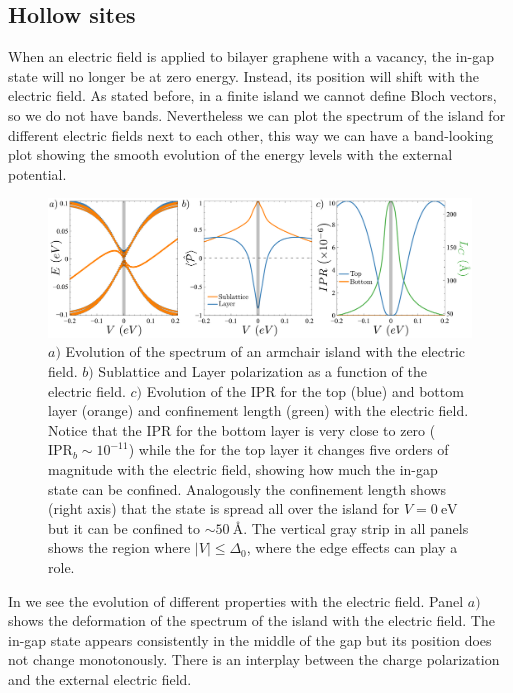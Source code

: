 \subsection{Hollow sites}
When an electric field is applied to bilayer graphene with a vacancy, the in-gap state will no longer be at zero energy. Instead, its position will shift with the electric field. As stated before, in a finite island we cannot define Bloch vectors, so we do not have bands. Nevertheless we can plot the spectrum of the island for different electric fields next to each other, this way we can have a band-looking plot showing the smooth evolution of the energy levels with the external potential.
\begin{figure}[!ht!]
\centering
\includegraphics{artlat/fig/spectrum.pdf}
\vspace{-20pt}
\caption{$a)$ Evolution of the spectrum of an armchair island with the electric field. $b)$ Sublattice and Layer polarization as a function of the electric field. $c)$ Evolution of the IPR for the top (blue) and bottom layer (orange) and confinement length (green) with the electric field. Notice that the IPR for the bottom layer is very close to zero ($\text{IPR}_b\sim10^{-11}$) while the for the top layer it changes five orders of magnitude with the electric field, showing how much the in-gap state can be confined. Analogously the confinement length shows (right axis) that the state is spread all over the island for $V=\SI{0}{\eV}$ but it can be confined to $\sim\SI{50}{\angstrom}$. The vertical gray strip in all panels shows the region where $|V|\leqslant\Delta_0$, where the edge effects can play a role.}
\label{spectrum}
\end{figure}
In  we see the evolution of different properties with the electric field. Panel $a)$ shows the deformation of the spectrum of the island with the electric field. The in-gap state appears consistently in the middle of the gap but its position does not change monotonously. There is an interplay between the charge polarization and the external electric field.
